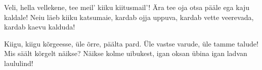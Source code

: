 Veli, hella vellekene,
tee meil' kiiku kiitusmail'!
\"Ara tee oja otsa p\"a\"ale
ega kaju kaldale!
Neiu l\"aeb kiiku katsumaie,
kardab ojja uppuva,
kardab vette veerevada,
kardab kaevu kalduda!

Kiigu, kiigu k\~orgeesse,
\"ule \~orre, p\"a\"alta pard.
\"Ule vastse varude,
\"ule tamme talude!
Mis s\"a\"alt k\~orgelt n\"aikse?
N\"aikse kolme uibukest,
igan oksan \"ubina
igan ladvan laululind!
